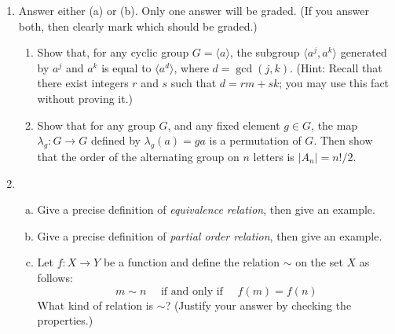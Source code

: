 \documentclass[fleqn,12pt]{article}
\newcommand{\<}{\ensuremath{\langle}}
\renewcommand{\>}{\ensuremath{\rangle}}
\begin{document}
\begin{enumerate}[{\bf 1.}]

\newpage
\item
  Answer either (a) or (b). Only one answer will be graded.  (If
  you answer both, then clearly mark which should be graded.)
  \begin{enumerate}
\item 
Show that, for any cyclic group $G = \<a\>$, 
the subgroup $\<a^j, a^k\>$ generated by $a^j$ and $a^k$ is equal to
$\<a^d\>$, where $d = \gcd(j,k)$.
(Hint: Recall that there exist integers $r$ and $s$ such that $d = rm + sk$; you
may use this fact without proving it.)
\item
Show that for any group $G$, and any fixed element $g \in G$,
the map $\lambda_g : G \rightarrow G$ defined by
$\lambda_g(a) = g a$ is a permutation of $G$.
Then show that the order of the alternating group on $n$ letters is $|A_n| = n!/2$.
\end{enumerate}

\newpage
\item
  \begin{enumerate}[(a)]
  \item Give a precise definition of \emph{equivalence relation}, then give an example.
    \vskip5cm
  \item Give a precise definition of \emph{partial order relation}, then give an example.
    \vskip5cm
    \item Let $f:X \rightarrow Y$ be a function and define the relation $\sim$
      on the set $X$ as follows:
    \[
    m \sim n \quad \text{ if and only if } \quad f(m) = f(n)
    \]
    What kind of relation is $\sim$?  (Justify your answer by checking the properties.)
  \end{enumerate}

\newpage
\end{enumerate}
\end{document}
